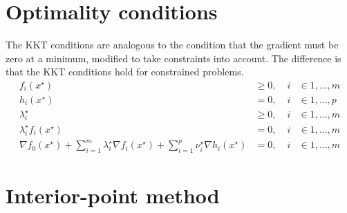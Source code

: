 \section{Optimality conditions}
The KKT conditions are analogous to the condition that the gradient must be zero at a minimum, modified to take constraints into account. The difference is that the KKT conditions hold for constrained problems.
\begin{align} \label{eq:kkt}
 f_i(x^\star) & \geq 0, \; & i & \in {1,\dots,m} \nonumber \\
 h_i(x^\star) & = 0, \; & i & \in {1,\dots,p} \nonumber \\
 \lambda_i^\star & \geq 0, \; & i & \in {1,\dots,m} \\
 \lambda_i^\star f_i(x^\star) & = 0, \; & i & \in {1,\dots,m} \nonumber \\
 \nabla f_0(x^\star) + \sum_{i=1}^m \lambda_i^\star \nabla f_i(x^\star)
  + \sum_{i=1}^p \nu_i^\star \nabla h_i(x^\star) & = 0, \; & i & \in {1,\dots,m} \nonumber
\end{align}

\section{Interior-point method}